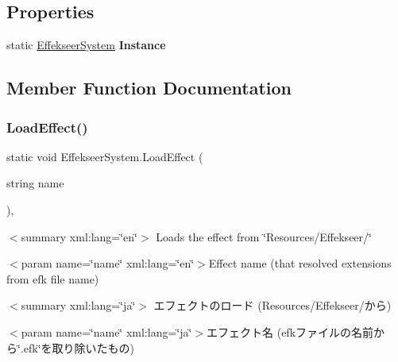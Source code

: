 \subsection*{Properties}
\begin{DoxyCompactItemize}
\item 
\mbox{\label{class_effekseer_system_abaa89ed68be2a0ff10f1ab7b04ce219a}} 
static \hyperlink{class_effekseer_system}{Effekseer\+System} {\bfseries Instance}
\end{DoxyCompactItemize}


\subsection{Member Function Documentation}
\mbox{\label{class_effekseer_system_af4059b796725905982565d8b239bf9fa}} 
\subsubsection{\texorpdfstring{Load\+Effect()}{LoadEffect()}\hspace{0.1cm}{\footnotesize\ttfamily [1/2]}}
{\footnotesize\ttfamily static void Effekseer\+System.\+Load\+Effect (\begin{DoxyParamCaption}\item[{string}]{name }\end{DoxyParamCaption})\hspace{0.3cm}{\ttfamily [inline]}, {\ttfamily [static]}}

$<$summary xml\+:lang=\char`\"{}en\char`\"{}$>$ Loads the effect from \char`\"{}\+Resources/\+Effekseer/\char`\"{} 

$<$param name=\char`\"{}name\char`\"{} xml\+:lang=\char`\"{}en\char`\"{}$>$Effect name (that resolved extensions from efk file name)

$<$summary xml\+:lang=\char`\"{}ja\char`\"{}$>$ エフェクトのロード (Resources/\+Effekseer/から) 

$<$param name=\char`\"{}name\char`\"{} xml\+:lang=\char`\"{}ja\char`\"{}$>$エフェクト名 (efkファイルの名前から\char`\"{}.\+efk\char`\"{}を取り除いたもの)\mbox{\label{class_effekseer_system_a4f7d874f76c4f354b70b852df590be72}} 
